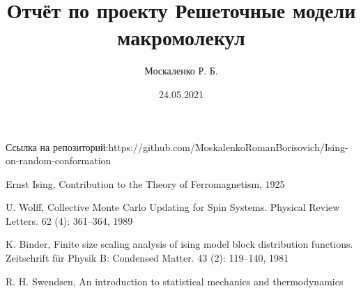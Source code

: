 \documentclass[hidelinks, a4paper,14pt]{extarticle}
\title{Отчёт по проекту Решеточные модели макромолекул}
\author{Москаленко Р. Б.}
\date{24.05.2021}
\begin{document}
\maketitle




\newpage
\tableofcontents
\newpage
%





%







\begin{thebibliography}{9}
 Ссылка на репозиторий:https://github.com/MoskalenkoRomanBorisovich/Ising-on-random-conformation 
 
Ernst Ising, Contribution to the Theory of Ferromagnetism, 1925


 U. Wolff, Collective Monte Carlo Updating for Spin Systems. Physical Review Letters. 62 (4): 361–364, 1989
 
 K. Binder, Finite size scaling analysis of ising model block distribution functions. Zeitschrift für Physik B: Condensed Matter. 43 (2): 119–140, 1981

 R. H. Swendsen, An introduction to statistical mechanics and thermodynamics
\end{thebibliography}
\end{document}
